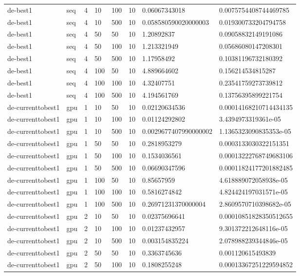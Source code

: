 \begin{table}[t]
\begin{tabular}{llllllll}
de-best1 & seq & 4 & 10 & 100 & 10 & 0.06067343018 & 0.0075754408744469785 \\
de-best1 & seq & 4 & 10 & 500 & 10 & 0.058580590020000003 & 0.019300733204794758 \\
de-best1 & seq & 4 & 50 & 50 & 10 & 1.20892837 & 0.09058832149191086 \\
de-best1 & seq & 4 & 50 & 100 & 10 & 1.213321949 & 0.05686080147208301 \\
de-best1 & seq & 4 & 50 & 500 & 10 & 1.17958492 & 0.10381196732180392 \\
de-best1 & seq & 4 & 100 & 50 & 10 & 4.889664602 & 0.156214534815287 \\
de-best1 & seq & 4 & 100 & 100 & 10 & 4.32407751 & 0.23541759273739812 \\
de-best1 & seq & 4 & 100 & 500 & 10 & 4.194561769 & 0.13756395899221754 \\
de-currenttobest1 & gpu & 1 & 10 & 50 & 10 & 0.02120634536 & 0.00014168210714434135 \\
de-currenttobest1 & gpu & 1 & 10 & 100 & 10 & 0.01124292802 & 3.4394973319361e-05 \\
de-currenttobest1 & gpu & 1 & 10 & 500 & 10 & 0.0029677407990000002 & 1.1365323090835353e-05 \\
de-currenttobest1 & gpu & 1 & 50 & 50 & 10 & 0.2818953279 & 0.0003133030322151351 \\
de-currenttobest1 & gpu & 1 & 50 & 100 & 10 & 0.1534036561 & 0.00013222768749683106 \\
de-currenttobest1 & gpu & 1 & 50 & 500 & 10 & 0.06690347596 & 0.00011824177201882485 \\
de-currenttobest1 & gpu & 1 & 100 & 50 & 10 & 0.85657959 & 4.618889072058938e-05 \\
de-currenttobest1 & gpu & 1 & 100 & 100 & 10 & 0.5816274842 & 4.824424197031571e-05 \\
de-currenttobest1 & gpu & 1 & 100 & 500 & 10 & 0.26971231370000004 & 2.8609570710398682e-05 \\
de-currenttobest1 & gpu & 2 & 10 & 50 & 10 & 0.02375696641 & 0.00010851828350512655 \\
de-currenttobest1 & gpu & 2 & 10 & 100 & 10 & 0.01237432957 & 9.301372212648116e-05 \\
de-currenttobest1 & gpu & 2 & 10 & 500 & 10 & 0.003154835224 & 2.078988239344846e-05 \\
de-currenttobest1 & gpu & 2 & 50 & 50 & 10 & 0.3363745636 & 0.001120615493839 \\
de-currenttobest1 & gpu & 2 & 50 & 100 & 10 & 0.1808255248 & 0.00013367251229594852 \\

\end{tabular}
\end{table}

